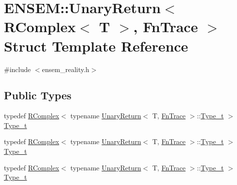 \hypertarget{structENSEM_1_1UnaryReturn_3_01RComplex_3_01T_01_4_00_01FnTrace_01_4}{}\section{E\+N\+S\+EM\+:\+:Unary\+Return$<$ R\+Complex$<$ T $>$, Fn\+Trace $>$ Struct Template Reference}
\label{structENSEM_1_1UnaryReturn_3_01RComplex_3_01T_01_4_00_01FnTrace_01_4}


{\ttfamily \#include $<$ensem\+\_\+reality.\+h$>$}

\subsection*{Public Types}
\begin{DoxyCompactItemize}
\item 
typedef \mbox{\hyperlink{classENSEM_1_1RComplex}{R\+Complex}}$<$ typename \mbox{\hyperlink{structENSEM_1_1UnaryReturn}{Unary\+Return}}$<$ T, \mbox{\hyperlink{structENSEM_1_1FnTrace}{Fn\+Trace}} $>$\+::\mbox{\hyperlink{structENSEM_1_1UnaryReturn_3_01RComplex_3_01T_01_4_00_01FnTrace_01_4_ad43642df789bc0ffa1a7589a833c8372}{Type\+\_\+t}} $>$ \mbox{\hyperlink{structENSEM_1_1UnaryReturn_3_01RComplex_3_01T_01_4_00_01FnTrace_01_4_ad43642df789bc0ffa1a7589a833c8372}{Type\+\_\+t}}
\item 
typedef \mbox{\hyperlink{classENSEM_1_1RComplex}{R\+Complex}}$<$ typename \mbox{\hyperlink{structENSEM_1_1UnaryReturn}{Unary\+Return}}$<$ T, \mbox{\hyperlink{structENSEM_1_1FnTrace}{Fn\+Trace}} $>$\+::\mbox{\hyperlink{structENSEM_1_1UnaryReturn_3_01RComplex_3_01T_01_4_00_01FnTrace_01_4_ad43642df789bc0ffa1a7589a833c8372}{Type\+\_\+t}} $>$ \mbox{\hyperlink{structENSEM_1_1UnaryReturn_3_01RComplex_3_01T_01_4_00_01FnTrace_01_4_ad43642df789bc0ffa1a7589a833c8372}{Type\+\_\+t}}
\item 
typedef \mbox{\hyperlink{classENSEM_1_1RComplex}{R\+Complex}}$<$ typename \mbox{\hyperlink{structENSEM_1_1UnaryReturn}{Unary\+Return}}$<$ T, \mbox{\hyperlink{structENSEM_1_1FnTrace}{Fn\+Trace}} $>$\+::\mbox{\hyperlink{structENSEM_1_1UnaryReturn_3_01RComplex_3_01T_01_4_00_01FnTrace_01_4_ad43642df789bc0ffa1a7589a833c8372}{Type\+\_\+t}} $>$ \mbox{\hyperlink{structENSEM_1_1UnaryReturn_3_01RComplex_3_01T_01_4_00_01FnTrace_01_4_ad43642df789bc0ffa1a7589a833c8372}{Type\+\_\+t}}
\end{DoxyCompactItemize}


